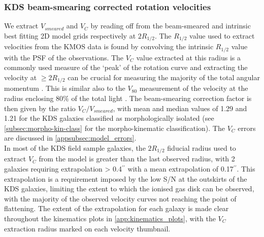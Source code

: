 \documentclass[fleqn,usenatbib]{mn2e}
\begin{document}
\subsubsection{KDS beam-smearing corrected rotation velocities}\label{subsubsec:beam_smearing_corrected_velocities}
We extract $V_{smeared}$ and $V_{C}$ by reading off from the beam-smeared and intrinsic best fitting 2D model grids respectively at $2R_{1/2}$.
The $R_{1/2}$ value used to extract velocities from the KMOS data is found by convolving the intrinsic $R_{1/2}$ value with the PSF of the observations.
The $V_{C}$ value extracted at this radius is a commonly used measure of the `peak' of the rotation curve \citep[e.g.][]{Miller2011,Pelliccia2016,Stott2016,Harrison2017} and extracting the velocity at $\geqslant 2R_{1/2}$ can be crucial for measuring the majority of the total angular momentum \citep[e.g.]{Obreschkow2015,Harrison2017}.
This is similar also to the $V_{80}$ measurement of the velocity at the radius enclosing 80$\%$ of the total light \citep{Tiley2016a}.
The beam-smearing correction factor is then given by the ratio $V_{C}/V_{smeared}$, with mean and median values of 1.29 and 1.21 for the KDS galaxies classified as morphologically isolated (see \cref{subsec:morpho-kin-class} for the morpho-kinematic classification).
The $V_{C}$ errors are discussed in \cref{appsubsec:model_errors}. \\

In most of the KDS field sample galaxies, the $2R_{1/2}$ fiducial radius used to extract $V_{C}$ from the model is greater than the last observed radius, with 2 galaxies requiring extrapolation > 0.4$^{\prime\prime}$ with a mean extrapolation of 0.17$^{\prime\prime}$.
This extrapolation is a requirement imposed by the low S/N at the outskirts of the KDS galaxies, limiting the extent to which the ionised gas disk can be observed, with the majority of the observed velocity curves not reaching the point of flattening. 
The extent of the extrapolation for each galaxy is made clear throughout the kinematics plots in \cref{app:kinematics_plots}, with the $V_{C}$ extraction radius marked on each velocity thumbnail.
\end{document}
